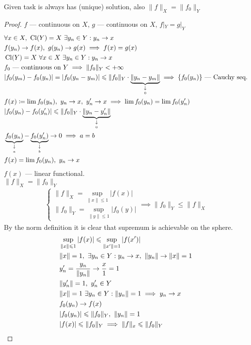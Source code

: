 \begin{thm}
  Given task is always has (unique) solution, also $\|f\|_X = \|f_0\|_Y$
\end{thm}

\begin{proof}
  $f$ --- continuous on $X$, $g$ --- continuous on $X$, $f|_Y = g|_Y$
  \begin{align*}
    &\forall x \in X,\ \cl{Y} = X\ \exists y_n \in Y : y_n \to x \\
    &f(y_n) \to f(x),\ g(y_n) \to g(x) \implies f(x) = g(x) \\
    &\cl{Y} = X\ \forall x \in X\ \exists y_n \in Y : y_n \to x\\
    &f_0\ \text{--- continuous on}\ Y \implies \|f_0\|_Y < +\infty \\
    &|f_0(y_m) - f_0(y_n)| = |f_0(y_n - y_m)| \leq \|f_0\|_Y \cdot \tendsto{\|y_n - y_m\|}{0} \implies \{f_0(y_n)\}\ \text{--- Cauchy seq.} \\
    &f(x) \coloneqq \lim f_0(y_n),\ y_n \to x,\ y_n' \to x \implies \lim f_0(y_n) = \lim f_0(y_n') \\
    &|f_0(y_n) - f_0(y_n')| \leq \|f_0\|_Y \cdot \tendsto{\|y_n - y_n'\|}{0} \\
    &\tendsto{f_0(y_n)}{a} - \tendsto{f_0(y_n')}{b} \to 0 \implies a = b \\
    &f(x) = \lim f_0(y_n),\ y_n \to x
  \end{align*}
  $f(x)$ --- linear functional. \\
  $\|f\|_X = \|f_0\|_Y$
  \begin{align*}
    \begin{cases}
      \|f\|_X = \sup\limits_{\|x\| \leq 1} |f(x)| \\
      \|f_0\|_Y = \sup\limits_{\|y\| \leq 1} |f_0(y)|
    \end{cases}
    \implies \|f_0\|_Y \leq \|f\|_X
  \end{align*}
  By the norm definition it is clear that supremum is achievable on the sphere.
  \begin{align*}
    &\sup_{\|x\| \leq 1}|f(x)| \leq \sup_{\|x'\| = 1} |f(x')| \\
    &\|x\| = 1,\ \exists y_n \in Y : y_n \to x,\ \|y_n\| \to \|x\| = 1 \\
    &y_n' = \dfrac{y_n}{\|y_n\|} \to \dfrac x1 = 1 \\
    &\|y_n'\| = 1,\ y_n' \in Y \\
    &\|x\| = 1\ \exists y_n \in Y : \|y_n\| = 1 \implies y_n \to x \\
    &f_0(y_n) \to f(x) \\
    &|f_0(y_n)| \leq \|f_0\|_Y,\ \|y_n\| = 1 \\
    &|f(x)| \leq \|f_0\|_Y \implies \|f\|_x \leq \|f_0\|_Y \qedhere 
  \end{align*}
\end{proof}

